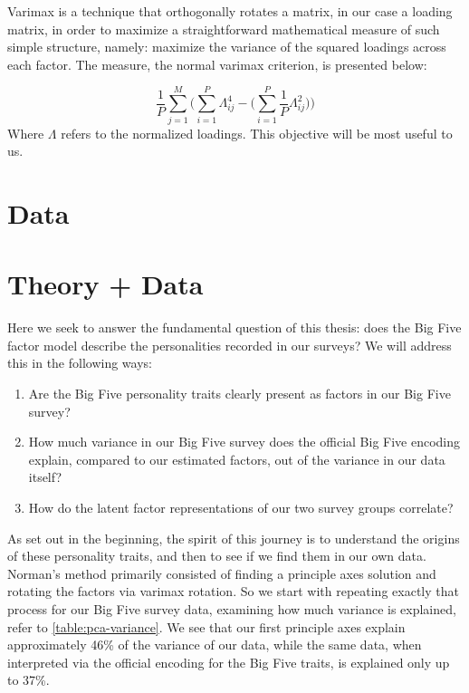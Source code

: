 \documentclass[a4paper,12pt]{article}
\begin{document}
Varimax is a technique that orthogonally rotates a matrix, in our case a loading matrix, in order to maximize a straightforward mathematical measure of such simple structure, namely: maximize the variance of the squared loadings across each factor. The measure, the normal varimax criterion, is presented below:

\begin{equation}
\frac{1}{P} \sum_{j=1}^M \bigg( \sum_{i=1}^P\Lambda_{ij}^4 - \bigg( \sum_{i=1}^P\frac{1}{P}\Lambda_{ij}^2\bigg)\bigg)
\end{equation}
%
Where $\Lambda$ refers to the normalized loadings. This objective will be most useful to us.

\section{Data}

\section{Theory + Data}

Here we seek to answer the fundamental question of this thesis: does the Big Five factor model describe the personalities recorded in our surveys? We will address this in the following ways:

\begin{enumerate}

\item Are the Big Five personality traits clearly present as factors in our Big Five survey?

\item How much variance in our Big Five survey does the official Big Five encoding explain, compared to our estimated factors, out of the variance in our data itself?

\item How do the latent factor representations of our two survey groups correlate?
\end{enumerate}

As set out in the beginning, the spirit of this journey is to understand the origins of these personality traits, and then to see if we find them in our own data. Norman's method primarily consisted of finding a principle axes solution and rotating the factors via varimax rotation. So we start with repeating exactly that process for our Big Five survey data, examining how much variance is explained, refer to \ref{table:pca-variance}. We see that our first principle axes explain approximately 46\% of the variance of our data, while the same data, when interpreted via the official encoding for the Big Five traits, is explained only up to 37\%.
\end{document}
